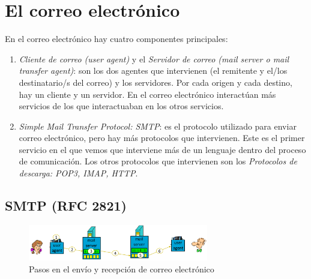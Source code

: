 \documentclass[10pt,a4paper,spanish]{report}
\begin{document}
\section{\textcolor{tema2}El correo electrónico}
En el correo electrónico hay cuatro componentes principales:
\begin{enumerate}[\color{tema2}{$\flat$}]
  \item \textit{\textcolor{tema2}{Cliente de correo (user agent)}} y el \textit{\textcolor{tema2}{Servidor de correo (mail server o mail transfer agent)}}: son los dos agentes que intervienen (el remitente y el/los destinatario/s del correo) y los servidores. Por cada origen y cada destino, hay un cliente y un servidor. En el correo electrónico interactúan más servicios de los que interactuaban en los otros servicios.
  \item \textit{\textcolor{tema2}{Simple Mail Transfer Protocol: SMTP}}: es el protocolo utilizado para enviar correo electrónico, pero hay más protocolos que intervienen. Este es el primer servicio en el que vemos que interviene más de un lenguaje dentro del proceso de comunicación. Los otros protocolos que intervienen son los \textit{\textcolor{tema2}{Protocolos de descarga: POP3, IMAP, HTTP}}.
\end{enumerate}

\subsection{\textcolor{tema2}SMTP (RFC 2821)}

\begin{figure}[!h]
\centering
\includegraphics[width=0.7\textwidth]{tema2_9}
\caption{Pasos en el envío y recepción de correo electrónico}
\label{pasoscorreo}
\end{figure}
\end{document}
